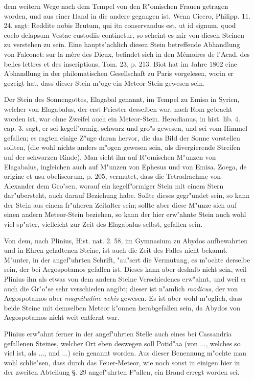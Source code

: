 \documentclass[a4paper, 11pt, oneside, polutonikogreek, german]{article}
\begin{document}
dem weitern Wege nach dem Tempel von den R"omischen Frauen getragen worden, und aus einer Hand in die andere gegangen ist. Wenn Cicero, Philipp. 11. 24. sagt: Reddite nobis Brutum, qui ita conservandus est, ut id signum, quod coelo delapsum Vestae custodiis continetur, so scheint es mir von diesen Steinen zu verstehen zu sein. Eine haupts"achlich diesen Stein betreffende Abhandlung von Falconet: sur la mère des Dieux, befindet sich in den Mémoires de l'Acad. des belles lettres et des inscriptions, Tom. 23, p. 213. Biot hat im Jahre 1802 eine Abhandlung in der philomatischen Gesellschaft zu Paris vorgelesen, worin er gezeigt hat, dass dieser Stein m"oge ein Meteor-Stein gewesen sein.

Der Stein des Sonnengottes, Elagabal genannt, im Tempel zu Emisa in Syrien, welcher von Elagabalus, der erst Priester desselben war, nach Rom gebracht worden ist, war ohne Zweifel auch ein Meteor-Stein. Herodianus, in hist. lib. 4. cap. 3. sagt, er sei kegelf"ormig, schwarz und gro"s gewesen, und sei vom Himmel gefallen; es ragten einige Z"uge daran hervor, die das Bild der Sonne vorstellen sollten, (die wohl nichts anders m"ogen gewesen sein, als divergierende Streifen auf der schwarzen Rinde). Man sieht ihn auf R"omischen M"unzen von Elagabalus, ingleichen auch auf M"unzen von Ephesus und von Emisa. Zoega, de origine et usu obeliscorum, p. 205, vermutet, dass die Tetradrachme von Alexander dem Gro"sen, worauf ein kegelf"ormiger Stein mit einem Stern dar"ubersteht, auch darauf Beziehung habe. Sollte dieses gegr"undet sein, so kann der Stein aus einem fr"uheren Zeitalter sein; sollte aber diese M"unze sich auf einen andern Meteor-Stein beziehen, so kann der hier erw"ahnte Stein auch wohl viel sp"ater, vielleicht zur Zeit des Elagabalus selbst, gefallen sein.

Von dem, nach Plinius, Hist. nat. 2. 58, im Gymnasium zu Abydos aufbewahrten und in Ehren gehaltenen Steine, ist auch die Zeit des Falles nicht bekannt. M"unter, in der angef"uhrten Schrift, "au"sert die Vermutung, es m"ochte derselbe sein, der bei Aegospotamos gefallen ist. Dieses kann aber deshalb nicht sein, weil Plinius ihn als etwas von dem andern Steine Verschiedenes erw"ahnt, und weil er auch die Gr"o"se sehr verschieden angibt; dieser ist n"amlich \emph{modicus}, der von Aegospotamos aber \emph{magnitudine vehis} gewesen. Es ist aber wohl m"oglich, dass beide Steine mit demselben Meteor k"onnen herabgefallen sein, da Abydos von Aegospotamos nicht weit entfernt war.

Plinius erw"ahnt ferner in der angef"uhrten Stelle auch eines bei Cassandria gefallenen Steines, welcher Ort eben deswegen soll Potid"aa (von ..., welches so viel ist, als ..., und ...) sein genannt worden. Aus dieser Benennung m"ochte man wohl schlie"sen, dass durch das Feuer-Meteor, wie noch sonst in einigen hier in der zweiten Abteilung §. 29 angef"uhrten F"allen, ein Brand erregt worden sei.
\end{document}
